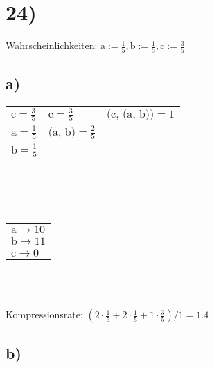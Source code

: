   \newpage

  \section*{24)}

  Wahrscheinlichkeiten: $\text{a} := \frac{1}{5}, \text{b} := \frac{1}{5}, \text{c} := \frac{3}{5}$

  \subsection*{a)}

  {
    \renewcommand{\arraystretch}{1.25}
    \begin{tabular}{l|l|l}
      $\text{c} = \frac{3}{5}$ &  $\text{c} = \frac{3}{5}$      &  $\text{(c, (a, b))} = 1$\\
      $\text{a} = \frac{1}{5}$ &  $\text{(a, b)} = \frac{2}{5}$ &  \\
      $\text{b} = \frac{1}{5}$ &
    \end{tabular}\\
    \\
    \\
    \begin{tabular}{l}
      $\text{a} \rightarrow 10$\\
      $\text{b} \rightarrow 11$\\
      $\text{c} \rightarrow 0$
    \end{tabular}\\
  }
  \\
  Kompressionsrate: $(2 \cdot \frac{1}{5} + 2 \cdot \frac{1}{5} + 1 \cdot \frac{3}{5}) / 1 = 1.4$

  \newpage

  \subsection*{b)}

